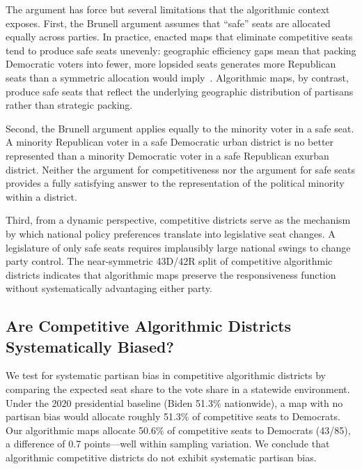 The argument has force but several limitations that the algorithmic context
exposes.  First, the Brunell argument assumes that ``safe'' seats are allocated
equally across parties.  In practice, enacted maps that eliminate competitive
seats tend to produce safe seats unevenly: geographic efficiency gaps mean
that packing Democratic voters into fewer, more lopsided seats generates
more Republican seats than a symmetric allocation would
imply~\citep{stephanopoulos2014}.  Algorithmic maps, by contrast, produce
safe seats that reflect the underlying geographic distribution of partisans
rather than strategic packing.

Second, the Brunell argument applies equally to the minority voter in a safe
seat.  A minority Republican voter in a safe Democratic urban district is no
better represented than a minority Democratic voter in a safe Republican
exurban district.  Neither the argument for competitiveness nor the argument
for safe seats provides a fully satisfying answer to the representation of
the political minority within a district.

Third, from a dynamic perspective, competitive districts serve as the
mechanism by which national policy preferences translate into legislative
seat changes.  A legislature of only safe seats requires implausibly large
national swings to change party control.  The near-symmetric 43D/42R split
of competitive algorithmic districts indicates that algorithmic maps preserve
the responsiveness function without systematically advantaging either party.

\subsection{Are Competitive Algorithmic Districts Systematically Biased?}

We test for systematic partisan bias in competitive algorithmic districts
by comparing the expected seat share to the vote share in a statewide
environment.  Under the 2020 presidential baseline (Biden 51.3\% nationwide),
a map with no partisan bias would allocate roughly 51.3\% of competitive
seats to Democrats.  Our algorithmic maps allocate 50.6\% of competitive
seats to Democrats (43/85), a difference of 0.7 points---well within sampling
variation.  We conclude that algorithmic competitive districts do not exhibit
systematic partisan bias.
